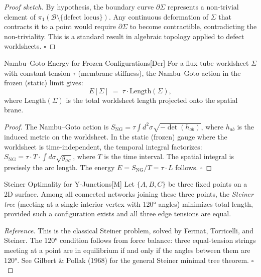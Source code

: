 \begin{proof}[Proof sketch]
By hypothesis, the boundary curve $\partial\Sigma$ represents a non-trivial element of
$\pi_1(\mathcal{B} \setminus \{\text{defect locus}\})$. Any continuous deformation of $\Sigma$
that contracts it to a point would require $\partial\Sigma$ to become contractible,
contradicting the non-triviality. This is a standard result in algebraic topology
applied to defect worldsheets. \hfill $\square$
\end{proof}

\begin{edcLemmaBox}{Nambu--Goto Energy for Frozen Configurations}{[Der]}
\label{lem:nambu_goto}
For a flux tube worldsheet $\Sigma$ with constant tension $\tau$ (membrane stiffness),
the Nambu--Goto action in the frozen (static) limit gives:
\begin{equation}
\label{eq:nambu_goto_energy}
E[\Sigma] \;=\; \tau \cdot \mathrm{Length}(\Sigma),
\end{equation}
where $\mathrm{Length}(\Sigma)$ is the total worldsheet length projected onto the spatial brane.
\end{edcLemmaBox}

\begin{proof}
The Nambu--Goto action is $S_{\mathrm{NG}} = \tau \int d^2\sigma \sqrt{-\det(h_{ab})}$,
where $h_{ab}$ is the induced metric on the worldsheet. In the static (frozen) gauge
where the worldsheet is time-independent, the temporal integral factorizes:
$S_{\mathrm{NG}} = \tau \cdot T \cdot \int d\sigma \sqrt{g_{\sigma\sigma}}$,
where $T$ is the time interval. The spatial integral is precisely the arc length.
The energy $E = S_{\mathrm{NG}}/T = \tau \cdot L$ follows. \hfill $\square$
\end{proof}

\begin{edcTheoremBox}{Steiner Optimality for Y-Junctions}{[M]}
\label{thm:steiner_routeA}
\label{thm:steiner}%
Let $\{A, B, C\}$ be three fixed points on a 2D surface. Among all connected networks
joining these three points, the \emph{Steiner tree} (meeting at a single interior
vertex with 120° angles) minimizes total length, provided such a configuration exists
and all three edge tensions are equal.
\end{edcTheoremBox}

\begin{proof}[Reference]
This is the classical Steiner problem, solved by Fermat, Torricelli, and Steiner.
The 120° condition follows from force balance: three equal-tension strings meeting
at a point are in equilibrium if and only if the angles between them are 120°.
See Gilbert \& Pollak (1968) for the general Steiner minimal tree theorem. \hfill $\square$
\end{proof}

